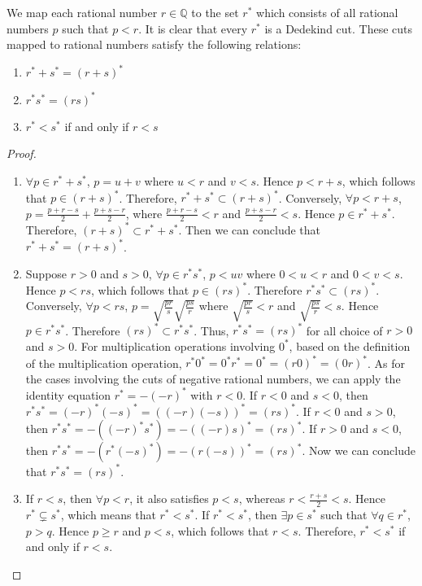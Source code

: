 \documentclass[onecolumn]{article}
\begin{document}
We map each rational number $r \in \mathbb{Q}$ to the set $r^*$ which consists 
of all rational numbers $p$ such that $p < r$. It is clear that every $r^*$ is a 
Dedekind cut. These cuts mapped to rational numbers satisfy the following 
relations:
\begin{enumerate}
  \item $r^* + s^* = (r + s)^*$
  \item $r^*s^* = (rs)^*$
  \item $r^* < s^*$ if and only if $r < s$
\end{enumerate}
\begin{proof}
  \begin{enumerate}
    \item $\forall p \in r^* + s^*$, $p = u + v$ where $u < r$ and $v < s$. 
    Hence $p < r + s$, which follows that $p \in (r + s)^*$. Therefore, 
    $r^* + s^* \subset (r+s)^*$. Conversely, $\forall p < r + s$, 
    $p = \frac{p + r - s}{2} + \frac{p + s - r}{2}$, where 
    $\frac{p + r - s}{2} < r$ and $\frac{p + s - r}{2} < s$. Hence 
    $p \in r^* + s^*$. Therefore, $(r + s)^* \subset r^* + s^*$. Then we can 
    conclude that $r^* + s^* = (r + s)^*$.
    \item Suppose $r > 0$ and $s > 0$, $\forall p \in r^*s^*$, $p < uv$ where 
    $0 < u < r$ and $0 < v < s$. Hence $p < rs$, which follows that 
    $p \in (rs)^*$. Therefore $r^*s^* \subset (rs)^*$. Conversely, 
    $\forall p < rs$, $p = \sqrt{\frac{pr}{s}}\sqrt{\frac{ps}{r}}$ where 
    $\sqrt{\frac{pr}{s}} < r$ and $\sqrt{\frac{ps}{r}} < s$. Hence 
    $p \in r^*s^*$. Therefore $(rs)^* \subset r^*s^*$. Thus, $r^*s^* = (rs)^*$ 
    for all choice of $r > 0$ and $s > 0$. For multiplication operations 
    involving $0^*$, based on the definition of the multiplication operation, 
    $r^*0^* = 0^*r^* = 0^* = (r0)^* = (0r)^*$. As for the cases involving the 
    cuts of negative rational numbers, we can apply the identity equation 
    $r^* = -(-r)^*$ with $r < 0$. If $r < 0$ and $s < 0$, then 
    $r^*s^* = (-r)^*(-s)^* = ((-r)(-s))^* = (rs)^*$. If $r < 0$ and $s > 0$, 
    then $r^*s^* = -((-r)^*s^*) = -((-r)s)^* = (rs)^*$. If $r > 0$ and $s < 0$, 
    then $r^*s^* = -(r^*(-s)^*) = -(r(-s))^* = (rs)^*$. Now we can conclude that 
    $r^*s^* = (rs)^*$.
    \item If $r < s$, then $\forall p < r$, it also satisfies $p < s$, whereas 
    $r < \frac{r + s}{2} < s$. Hence $r^* \subsetneq s^*$, which means that 
    $r^* < s^*$. If $r^* < s^*$, then $\exists p \in s^*$ such that 
    $\forall q \in r^*$, $p > q$. Hence $p \geq r$ and $p < s$, which follows 
    that $r < s$. Therefore, $r^* < s^*$ if and only if $r < s$.
  \end{enumerate}
\end{proof}
\end{document}
